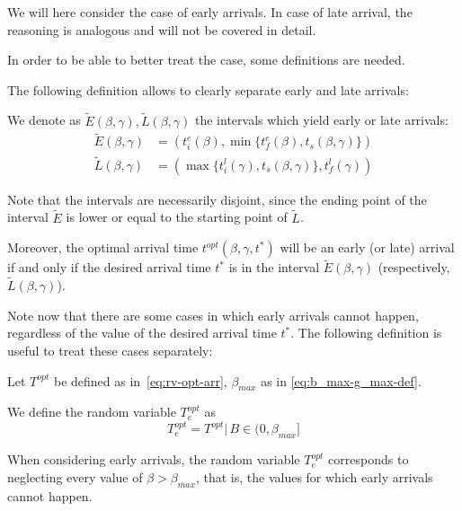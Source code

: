 We will here consider the case of early arrivals.
In case of late arrival, the reasoning is analogous and will not be covered in detail.

In order to be able to better treat the case,
some definitions are needed.

The following definition allows to clearly separate early and late arrivals:
\begin{definition}
  \label{def:intervals-tilde}
  We denote as \(\tilde{E}(\beta, \gamma), \tilde{L}(\beta, \gamma)\) the intervals which yield early or late arrivals:
  \begin{align*}
    \tilde{E}(\beta, \gamma) & = (t_i^e(\beta), \min\{t_f^e(\beta), t_s(\beta, \gamma)\})\\
    \tilde{L}(\beta, \gamma) & = (\max\{t_i^l(\gamma), t_s(\beta, \gamma)\}, t_f^l(\gamma))
  \end{align*}
\end{definition}

Note that the intervals are necessarily disjoint,
since the ending point of the interval \(\tilde{E}\) is lower or equal to the starting point of \(\tilde{L}\).

Moreover,
the optimal arrival time \(t^{opt}(\beta, \gamma, t^*)\) will be an early (or late) arrival
if and only if the desired arrival time \(t^*\)
is in the interval \(\tilde{E}(\beta, \gamma)\) (respectively, \(\tilde{L}(\beta, \gamma)\)).

Note now that there are some cases in which early arrivals cannot happen,
regardless of the value of the desired arrival time \(t^*\).
The following definition is useful to treat these cases separately:
\begin{definition}
  Let \(T^{opt}\) be defined as in~\eqref{eq:rv-opt-arr}, \(\beta_{max}\) as in \eqref{eq:b_max-g_max-def}.

  We define the random variable \(T_e^{opt}\) as
  \begin{equation*}
    T_e^{opt} = T^{opt} |\, B \in (0, \beta_{max}]
  \end{equation*}
\end{definition}

When considering early arrivals,
the random variable \(T_e^{opt}\) corresponds to neglecting every value of \(\beta > \beta_{max}\),
that is,
the values for which early arrivals cannot happen.

